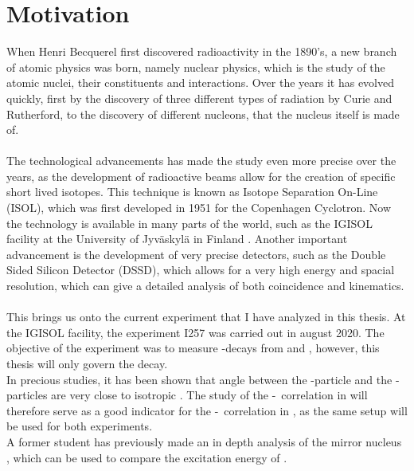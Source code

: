 \section{Motivation}
When Henri Becquerel first discovered radioactivity in the 1890's, a new branch of atomic physics was born, namely nuclear physics, which is the study of the atomic nuclei, their constituents and interactions. 
Over the years it has evolved quickly, first by the discovery of three different types of radiation by Curie and Rutherford, to the discovery of different nucleons, that the nucleus itself is made of. \\
\\
The technological advancements has made the study even more precise over the years, as the development of radioactive beams allow for the creation of specific short lived isotopes.
This technique is known as Isotope Separation On-Line (ISOL), which was first developed in 1951 for the Copenhagen Cyclotron. 
Now the technology is available in many parts of the world, such as the IGISOL facility at the University of Jyväskylä in Finland \cite{igisol}. 
Another important advancement is the development of very precise detectors, such as the Double Sided Silicon Detector (DSSD), which allows for a very high energy and spacial resolution, which can give a detailed analysis of both coincidence and kinematics. \\
\\
This brings us onto the current experiment that I have analyzed in this thesis. At the IGISOL facility, the experiment I257 was carried out in august 2020. The objective of the experiment was to measure \be-decays from \li and , however, this thesis will only govern the \li decay. \\
In precious studies, it has been shown that angle between the \be-particle and the \al-particles are very close to isotropic \cite{isotrop}. The study of the \be-\al\ correlation in \li will therefore serve as a good indicator for the \be-\al\ correlation in , as the same setup will be used for both experiments. \\
A former student has previously made an in depth analysis of the mirror nucleus , which can be used to compare the excitation energy of \ber \cite{andreas}. 


